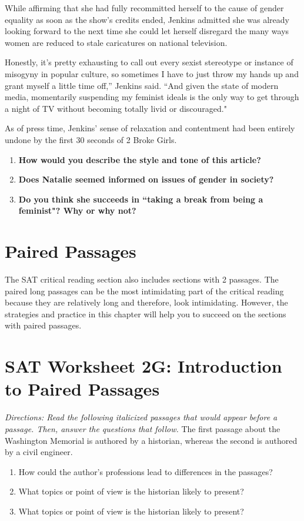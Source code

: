 \documentclass[12pt]{book}
\renewcommand{\indent}{\hspace{1cm}}
\begin{document}
\begin{linenumbers*}
\indent While affirming that she had fully recommitted herself to the cause of gender equality as soon as the show's credits ended, Jenkins admitted she was already looking forward to the next time she could let herself disregard the many ways women are reduced to stale caricatures on national television.

\indent Honestly, it's pretty exhausting to call out every sexist stereotype or instance of misogyny in popular culture, so sometimes I have to just throw my hands up and grant myself a little time off,” Jenkins said. ``And given the state of modern media, momentarily suspending my feminist ideals is the only way to get through a night of TV without becoming totally livid or discouraged."

\indent As of press time, Jenkins' sense of relaxation and contentment had been entirely undone by the first 30 seconds of 2 Broke Girls.
\end{linenumbers*}

\begin{enumerate}
\item \textbf{How would you describe the style and tone of this article?}
\vfill\item \textbf{Does Natalie seemed informed on issues of gender in society?}
\vfill\item \textbf{Do you think she succeeds in ``taking a break from being a feminist"? Why or why not?}
\end {enumerate}

\vfill
\newpage
\section{Paired Passages}
The SAT critical reading section also includes sections with 2 passages. The paired long passages can be the most intimidating part of the critical reading because they are relatively long and therefore, look intimidating. However, the strategies and practice in this chapter will help you to succeed on the sections with paired passages.

\vfill
\section[Intro to Paired Passages]{SAT Worksheet 2G: Introduction to Paired Passages}
\textit{Directions: Read the following italicized passages that would appear before a passage. Then, answer the questions that follow.}
The first passage about the Washington Memorial is authored by a historian, whereas the second is authored by a civil engineer.
\begin{enumerate}
\item How could the author's professions lead to differences in the passages?

\hrulefill
\item What topics or point of view is the historian likely to present?

\hrulefill
\item What topics or point of view is the historian likely to present?

\hrulefill
\end{enumerate}
\end{document}
